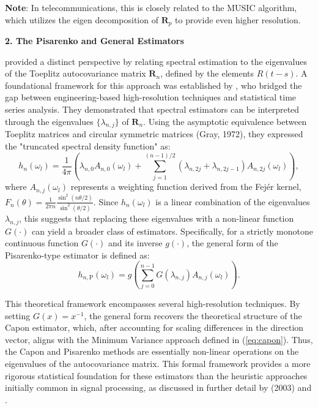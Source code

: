 \documentclass[twoside]{article}
\begin{document}
\textbf{Note}: In telecommunications, this is closely related to the MUSIC algorithm, which utilizes the eigen decomposition of $\mathbf{R}_p$ to provide even higher resolution.



\textbf{2. The Pisarenko and General Estimators}



\cite{Pisarenko:1972}  provided a distinct perspective by relating spectral estimation to the eigenvalues of the Toeplitz autocovariance matrix $\mathbf{R}_n$, defined by the elements $R(t-s)$. A foundational framework for this approach was established by \cite{SubbaRaoGabr:1989}, who bridged the gap between engineering-based high-resolution techniques and statistical time series analysis. They demonstrated that spectral estimators can be interpreted through the eigenvalues $\{\lambda_{n,j}\}$ of $\mathbf{R}_n$. Using the asymptotic equivalence between Toeplitz matrices and circular symmetric matrices (Gray, 1972), they expressed the "truncated spectral density function" as:
\begin{equation}h_n(\omega_l) = \frac{1}{4\pi} \left( \lambda_{n,0} A_{n,0}(\omega_l) + \sum_{j=1}^{(n-1)/2} (\lambda_{n,2j} + \lambda_{n,2j-1}) A_{n,2j}(\omega_l) \right),
\end{equation}
where $A_{n,j}(\omega_l)$ represents a weighting function derived from the Fejér kernel, $F_n(\theta) = \frac{1}{2\pi n} \frac{\sin^2(n\theta/2)}{\sin^2(\theta/2)}$. Since $h_n(\omega_l)$ is a linear combination of the eigenvalues $\lambda_{n,j}$, this suggests that replacing these eigenvalues with a non-linear function $G(\cdot)$ can yield a broader class of estimators. Specifically, for a strictly monotone continuous function $G(\cdot)$ and its inverse $g(\cdot)$, the general form of the Pisarenko-type estimator is defined as:
\begin{equation}h_{n,\mathrm{P}}(\omega_l) = g\left( \sum_{j=0}^{n-1} G(\lambda_{n,j}) A_{n,j}(\omega_l) \right).\label{eq:pisarenko}
\end{equation}



This theoretical framework encompasses several high-resolution techniques. By setting $G(x) = x^{-1}$, the general form recovers the theoretical structure of the Capon estimator, which, after accounting for scaling differences in the direction vector, aligns with the Minimum Variance approach defined in (\ref{eq:capon}). Thus, the Capon and Pisarenko methods are essentially non-linear operations on the eigenvalues of the autocovariance matrix. This formal framework provides a more rigorous statistical foundation for these estimators than the heuristic approaches initially common in signal processing, as discussed in further detail by \cite{Larsonetal:2003} (2003) and \cite{StoicaMoses:2005}.
\end{document}
